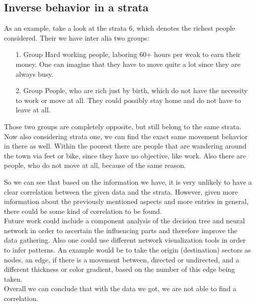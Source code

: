 	\subsection{Inverse behavior in a strata}
	As an example, take a look at the strata 6, which denotes the richest people considered. Their we have inter alia two groups: 
	\begin{enumerate}
		\setlength{\itemindent}{1cm}
		\item[1. Group]
		Hard working people, laboring 60+ hours per weak to earn their money. One can imagine that they have to move quite a lot since they are always busy.
		\item[2. Group]
		People, who are rich just by birth, which do not have the necessity to work or move at all. They could possibly stay home and do not have to leave at all.
	\end{enumerate} 
	Those two groups are completely opposite, but still belong to the same strata. Now also considering strata one, we can find the exact same movement behavior in there as well. Within the poorest there are people that are wandering around the town via feet or bike, since they have no objective, like work. Also there are people, who do not move at all, because of the same reason.	
	
	So we can see that based on the information we have, it is very unlikely to have a clear correlation between the given data and the strata. However, given more information about the previously mentioned aspects and more entries in general, there could be some kind of correlation to be found.\\
	Future work could include a component analysis of the decision tree and neural network in order to ascertain the influencing parts and therefore improve the data gathering. Also one could use different network visualization tools in order to infer patterns. An example would be to take the origin (destination) sectors as nodes, an edge, if there is a movement between, directed or undirected, and a different thickness or color gradient, based on the number of this edge being taken.\\
	
	Overall we can conclude that with the data we got, we are not able to find a correlation.